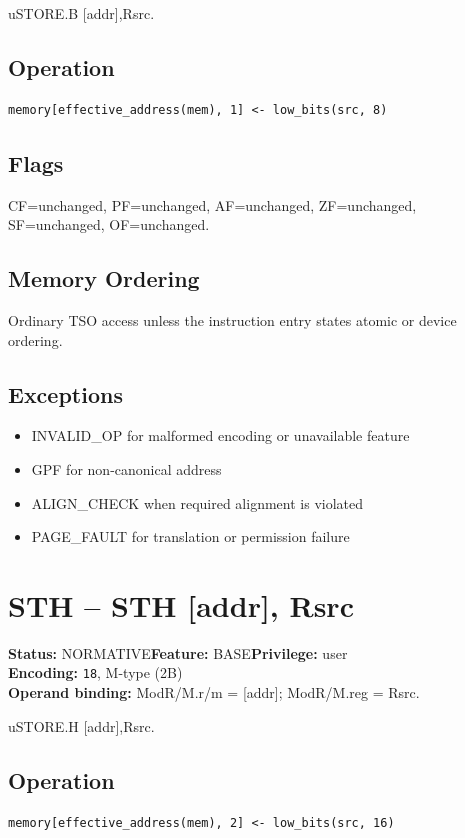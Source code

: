 \documentclass[10pt]{article}
\begin{document}
uSTORE.B [addr],Rsrc.

\subsection*{Operation}
\begin{lstlisting}
memory[effective_address(mem), 1] <- low_bits(src, 8)
\end{lstlisting}
\subsection*{Flags}
CF=unchanged, PF=unchanged, AF=unchanged, ZF=unchanged, SF=unchanged, OF=unchanged.
\subsection*{Memory Ordering}
Ordinary TSO access unless the instruction entry states atomic or device ordering.
\subsection*{Exceptions}
\begin{itemize}
\item INVALID\_OP for malformed encoding or unavailable feature
\item GPF for non-canonical address
\item ALIGN\_CHECK when required alignment is violated
\item PAGE\_FAULT for translation or permission failure
\end{itemize}
\clearpage

\section{STH -- STH [addr], Rsrc}
\textbf{Status:} NORMATIVE\quad \textbf{Feature:} BASE\quad \textbf{Privilege:} user\\
\textbf{Encoding:} \texttt{18}, M-type (2B)\\
\textbf{Operand binding:} ModR/M.r/m = [addr]; ModR/M.reg = Rsrc.

uSTORE.H [addr],Rsrc.

\subsection*{Operation}
\begin{lstlisting}
memory[effective_address(mem), 2] <- low_bits(src, 16)
\end{lstlisting}
\end{document}
